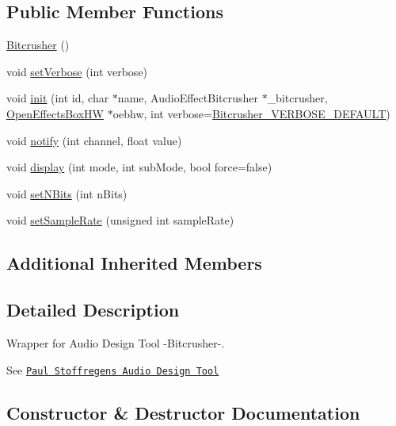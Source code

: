 \subsection*{Public Member Functions}
\begin{DoxyCompactItemize}
\item 
\mbox{\hyperlink{class_bitcrusher_ad130a5c022020a6e64ed6dc75f8d2372}{Bitcrusher}} ()
\item 
void \mbox{\hyperlink{class_bitcrusher_a2ea948d02aaeec7ef5af9dd35346d29c}{set\+Verbose}} (int verbose)
\item 
void \mbox{\hyperlink{class_bitcrusher_a8d46a549db08c6c022c55f10b348647d}{init}} (int id, char $\ast$name, Audio\+Effect\+Bitcrusher $\ast$\+\_\+bitcrusher, \mbox{\hyperlink{class_open_effects_box_h_w}{Open\+Effects\+Box\+HW}} $\ast$oebhw, int verbose=\mbox{\hyperlink{_bitcrusher_8h_a11f2932e6b24f27a8025c6bfe4e234c0}{Bitcrusher\+\_\+\+V\+E\+R\+B\+O\+S\+E\+\_\+\+D\+E\+F\+A\+U\+LT}})
\item 
void \mbox{\hyperlink{class_bitcrusher_ae392ad4b140a5121df417ece060911f4}{notify}} (int channel, float value)
\item 
void \mbox{\hyperlink{class_bitcrusher_aa5d365b3690a76f968465b9e841720f6}{display}} (int mode, int sub\+Mode, bool force=false)
\item 
void \mbox{\hyperlink{class_bitcrusher_a4c2ecf3d6fc604a9967685256a886503}{set\+N\+Bits}} (int n\+Bits)
\item 
void \mbox{\hyperlink{class_bitcrusher_a0b50f63f1b533074ef8acd41714ae1d3}{set\+Sample\+Rate}} (unsigned int sample\+Rate)
\end{DoxyCompactItemize}
\subsection*{Additional Inherited Members}


\subsection{Detailed Description}
Wrapper for Audio Design Tool -\/\+Bitcrusher-\/. 

See \href{https://www.pjrc.com/teensy/gui/}{\tt Paul Stoffregen\textquotesingle{}s Audio Design Tool} 

\subsection{Constructor \& Destructor Documentation}
\mbox{\label{class_bitcrusher_ad130a5c022020a6e64ed6dc75f8d2372}} 
